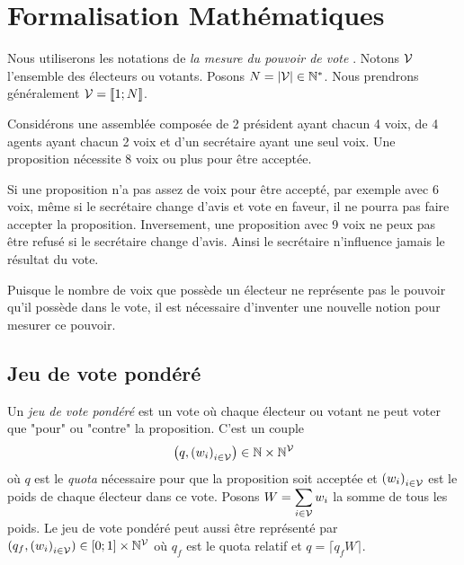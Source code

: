 

\section{Formalisation Mathématiques}

Nous utiliserons les notations de \textit{la mesure du pouvoir de vote} \cite{mesure_pouvoir}. Notons $\mathcal{V}$ l'ensemble des électeurs ou votants.
Posons $N = |\mathcal{V}| \in \mathbb{N}^*$. Nous prendrons généralement $\mathcal{V} = [\![1;N]\!]$.

\begin{exemple}
	Considérons une assemblée composée de 2 président ayant chacun 4 voix, de 4 agents ayant chacun 2 voix et d'un secrétaire ayant une seul voix. Une proposition nécessite 8 voix ou plus pour être acceptée.
	
	Si une proposition n'a pas assez de voix pour être accepté, par exemple avec 6 voix, même si le secrétaire change d'avis et vote en faveur, il ne pourra pas faire accepter la proposition.
	Inversement, une proposition avec 9 voix ne peux pas être refusé si le secrétaire change d'avis.
	Ainsi le secrétaire n'influence jamais le résultat du vote.
\end{exemple}

Puisque le nombre de voix que possède un électeur ne représente pas le pouvoir qu'il possède dans le vote, il est nécessaire d'inventer une nouvelle notion pour mesurer ce pouvoir.


\subsection{Jeu de vote pondéré}

\begin{definition}
	Un \textit{jeu de vote pondéré} est un vote où chaque électeur ou votant ne peut voter que "pour" ou "contre" la proposition. C'est un couple 
	\begin{equation}
		\left( q, \left(w_i\right)_{i \in \mathcal{V}} \right)
		\in \mathbb{N} \times \mathbb{N}^{\mathcal{V}}
	\end{equation}
	où $q$ est le \textit{quota} nécessaire pour que la proposition soit acceptée et $\left(w_i\right)_{i \in \mathcal{V}}$ est le poids de chaque électeur dans ce vote.
	Posons $W = \displaystyle \sum_{i \in \mathcal{V}} w_i$ la somme de tous les poids. Le jeu de vote pondéré peut aussi être représenté par $(q_f, \left(w_i\right)_{i \in \mathcal{V}}) \in [0;1] \times \mathbb{N}^{\mathcal{V}}$ où $q_f$ est le quota relatif et $q = \lceil q_f W \rceil$.
\end{definition}

